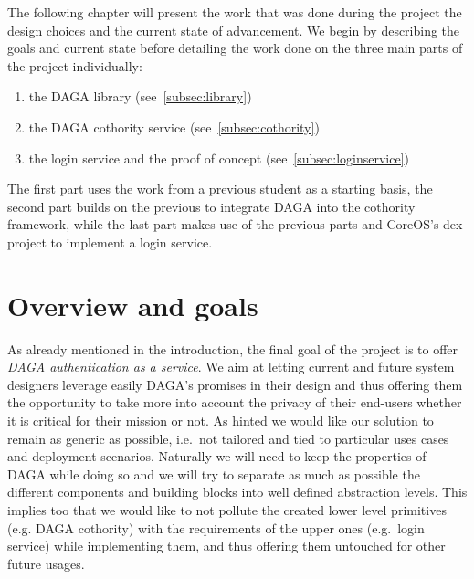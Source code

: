 
    The following chapter will present the work that was done during the project the design choices and the current state of advancement.
    We begin by describing the goals and current state before detailing the work done on the three main parts of the project individually:
    \begin{enumerate}[leftmargin=!,itemsep=-1ex]
        \item the DAGA library (see~\autoref{subsec:library})
        \item the DAGA cothority service (see~\autoref{subsec:cothority})
        \item the login service and the proof of concept (see~\autoref{subsec:loginservice})
    \end{enumerate}

    The first part uses the work from a previous student as a starting basis,
    the second part builds on the previous to integrate DAGA into the cothority framework,
    while the last part makes use of the previous parts and CoreOS's dex project
    to implement a login service.

    \section{Overview and goals}
    As already mentioned in the introduction, the final goal of the project is to offer
    \emph{DAGA authentication as a service}.
    We aim at letting current and future system designers leverage easily DAGA's promises in their design and thus
    offering them the opportunity to take more into account the privacy of their end-users whether it is critical for their mission or not.
    As hinted we would like our solution to remain as generic as possible, i.e.\ not tailored and tied to particular uses
    cases and deployment scenarios.
    Naturally we will need to keep the properties of DAGA while doing so and we will
    try to separate as much as possible the different components and building blocks into well defined abstraction levels. This implies too that we would like to not pollute the created lower level primitives (e.g. DAGA cothority) with the
    requirements of the upper ones (e.g.\ login service) while implementing them, and thus offering them untouched for other
    future usages.


